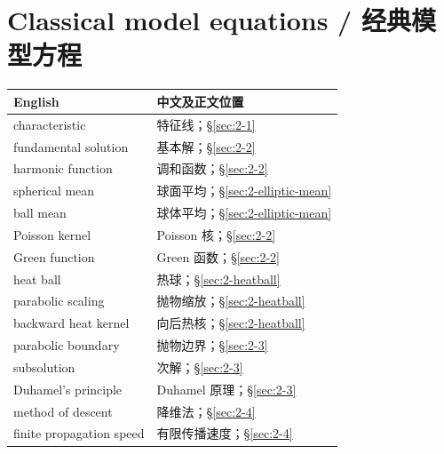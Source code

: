 \section*{Classical model equations / 经典模型方程}
\begin{center}\small
\begin{tabular}{@{}p{.53\linewidth}p{.38\linewidth}@{}}
\textbf{English}&\textbf{中文及正文位置}\\\hline
characteristic & 特征线；\S\ref{sec:2-1}\\
fundamental solution & 基本解；\S\ref{sec:2-2}\\
harmonic function & 调和函数；\S\ref{sec:2-2}\\
spherical mean & 球面平均；\S\ref{sec:2-elliptic-mean}\\
ball mean & 球体平均；\S\ref{sec:2-elliptic-mean}\\
Poisson kernel & Poisson 核；\S\ref{sec:2-2}\\
Green function & Green 函数；\S\ref{sec:2-2}\\
heat ball & 热球；\S\ref{sec:2-heatball}\\
parabolic scaling & 抛物缩放；\S\ref{sec:2-heatball}\\
backward heat kernel & 向后热核；\S\ref{sec:2-heatball}\\
parabolic boundary & 抛物边界；\S\ref{sec:2-3}\\
subsolution & 次解；\S\ref{sec:2-3}\\
Duhamel's principle & Duhamel 原理；\S\ref{sec:2-3}\\
method of descent & 降维法；\S\ref{sec:2-4}\\
finite propagation speed & 有限传播速度；\S\ref{sec:2-4}
\end{tabular}
\end{center}



